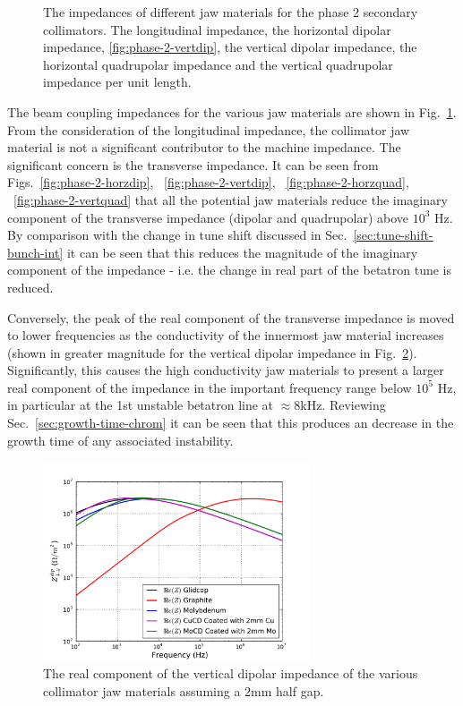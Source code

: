 \begin{figure}
{\label{fig:phase-2-vertquad}
}
\caption{The impedances of different jaw materials for the phase 2 secondary collimators.  The longitudinal impedance,  the horizontal dipolar impedance, \ref{fig:phase-2-vertdip}, the vertical dipolar impedance,  the horizontal quadrupolar impedance and  the vertical quadrupolar impedance per unit length.}
\label{fig:phase-2-jaw-impedances}
\end{figure}

The beam coupling impedances for the various jaw materials are shown in Fig.~\ref{fig:phase-2-jaw-impedances}. From the consideration of the longitudinal impedance, the collimator jaw material is not a significant contributor to the machine impedance. The significant concern is the transverse impedance. It can be seen from Figs.~\ref{fig:phase-2-horzdip}, ~\ref{fig:phase-2-vertdip}, ~\ref{fig:phase-2-horzquad}, ~\ref{fig:phase-2-vertquad} that all the potential jaw materials reduce the imaginary component of the transverse impedance (dipolar and quadrupolar) above $10^{3}$ Hz. By comparison with the change in tune shift discussed in Sec.~\ref{sec:tune-shift-bunch-int} it can be seen that this reduces the magnitude of the imaginary component of the impedance - i.e. the change in real part of the betatron tune is reduced. 

Conversely, the peak of the real component of the transverse impedance is moved to lower frequencies as the conductivity of the innermost jaw material increases (shown in greater magnitude for the vertical dipolar impedance in Fig.~\ref{fig:phase-2-vertdip-zoom}). Significantly, this causes the high conductivity jaw materials to present a larger real component of the impedance in the important frequency range below $10^{5}$ Hz, in particular at the 1st unstable betatron line at $\approx8$kHz. Reviewing Sec.~\ref{sec:growth-time-chrom} it can be seen that this produces an decrease in the growth time of any associated instability. 

\begin{figure}
\begin{center}
\includegraphics[width=0.7\textwidth]{LHC_Collimation_Upgrades/figures/vertDipolarZoom.pdf}
\end{center}
\caption{The real component of the vertical dipolar impedance of the various collimator jaw materials assuming a 2mm half gap.}
\label{fig:phase-2-vertdip-zoom}
\end{figure}
